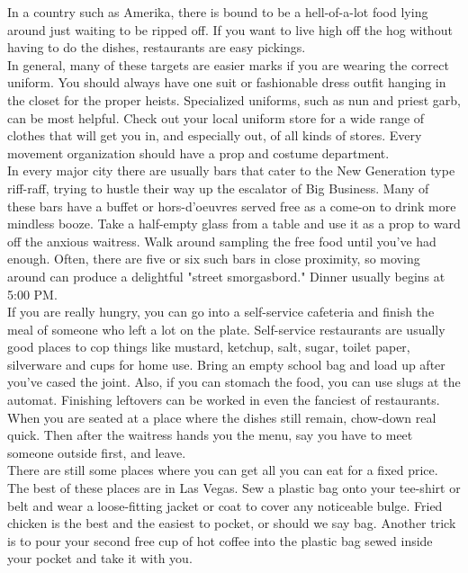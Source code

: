 \documentclass[11pt,twoside,a4paper]{book}
\begin{document}
In a country such as Amerika, there is bound to be a hell-of-a-lot food lying around just waiting to be ripped off. If you want to live high off the hog without having to do the dishes, restaurants are easy pickings.~\\ 

In general, many of these targets are easier marks if you are wearing the correct uniform. You should always have one suit or fashionable dress outfit hanging in the closet for the proper heists. Specialized uniforms, such as nun and priest garb, can be most helpful. Check out your local uniform store for a wide range of clothes that will get you in, and especially out, of all kinds of stores. Every movement organization should have a prop and costume department.~\\

In every major city there are usually bars that cater to the New Generation type riff-raff, trying to hustle their way up the escalator of Big Business. Many of these bars have a buffet or hors-d'oeuvres served free as a come-on to drink more mindless booze. Take a half-empty glass from a table and use it as a prop to ward off the anxious waitress. Walk around sampling the free food until you've had enough. Often, there are five or six such bars in close proximity, so moving around can produce a delightful "street smorgasbord." Dinner usually begins at 5:00 PM.~\\

If you are really hungry, you can go into a self-service cafeteria and finish the meal of someone who left a lot on the plate. Self-service restaurants are usually good places to cop things like mustard, ketchup, salt, sugar, toilet paper, silverware and cups for home use. Bring an empty school bag and load up after you've cased the joint. Also, if you can stomach the food, you can use slugs at the automat. Finishing leftovers can be worked in even the fanciest of restaurants. When you are seated at a place where the dishes still remain, chow-down real quick. Then after the waitress hands you the menu, say you have to meet someone outside first, and leave.~\\

There are still some places where you can get all you can eat for a fixed price. The best of these places are in Las Vegas. Sew a plastic bag onto your tee-shirt or belt and wear a loose-fitting jacket or coat to cover any noticeable bulge. Fried chicken is the best and the easiest to pocket, or should we say bag. Another trick is to pour your second free cup of hot coffee into the plastic bag sewed inside your pocket and take it with you.~\\
\end{document}
